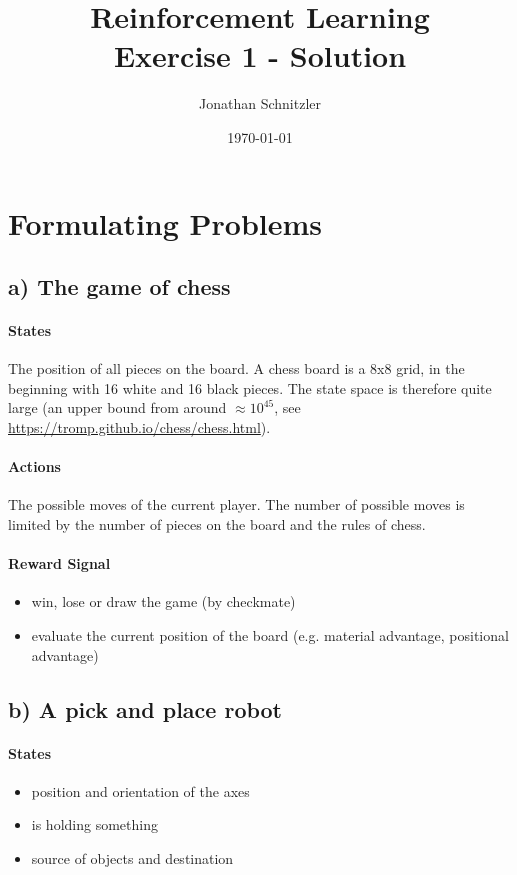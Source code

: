 \documentclass{article}
\title{Reinforcement Learning \\ Exercise 1 - Solution}
\author{Jonathan Schnitzler}
\date{\today}
\begin{document}
\maketitle




\section{Formulating Problems}

\subsection*{a) The game of chess}

\paragraph*{States}
The position of all pieces on the board. A chess board is a 8x8 grid, in the beginning with 16 white and 16 black pieces. The state space is therefore quite large (an upper bound from around $\approx 10^45$, see \url{https://tromp.github.io/chess/chess.html}).

\paragraph*{Actions}
The possible moves of the current player. The number of possible moves is limited by the number of pieces on the board and the rules of chess.

\paragraph*{Reward Signal}
\begin{itemize}
    \item win, lose or draw the game (by checkmate)
    \item evaluate the current position of the board (e.g. material advantage, positional advantage)
\end{itemize}




\subsection*{b) A pick and place robot}

\paragraph*{States}
\begin{itemize}
    \item position and orientation of the axes
    \item is holding something
    \item source of objects and destination
\end{itemize}
\end{document}
